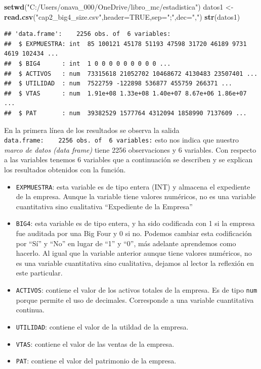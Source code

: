 \documentclass[]{book}
\newenvironment{Shaded}{\begin{snugshade}}{\end{snugshade}}
\newcommand{\KeywordTok}[1]{\textcolor[rgb]{0.13,0.29,0.53}{\textbf{#1}}}
\newcommand{\DataTypeTok}[1]{\textcolor[rgb]{0.13,0.29,0.53}{#1}}
\newcommand{\StringTok}[1]{\textcolor[rgb]{0.31,0.60,0.02}{#1}}
\newcommand{\OtherTok}[1]{\textcolor[rgb]{0.56,0.35,0.01}{#1}}
\newcommand{\NormalTok}[1]{#1}
\providecommand{\tightlist}{%
  \setlength{\itemsep}{0pt}\setlength{\parskip}{0pt}}
\begin{document}
\begin{Shaded}
\begin{Highlighting}[]
\KeywordTok{setwd}\NormalTok{(}\StringTok{"C:/Users/onava_000/OneDrive/libro_mc/estadistica"}\NormalTok{)}
\NormalTok{datos1 <-}\StringTok{ }\KeywordTok{read.csv}\NormalTok{(}\StringTok{"cap2_big4_size.csv"}\NormalTok{,}\DataTypeTok{header=}\OtherTok{TRUE}\NormalTok{,}\DataTypeTok{sep=}\StringTok{";"}\NormalTok{,}\DataTypeTok{dec=}\StringTok{","}\NormalTok{)}
\KeywordTok{str}\NormalTok{(datos1)}
\end{Highlighting}
\end{Shaded}

\begin{verbatim}
## 'data.frame':    2256 obs. of  6 variables:
##  $ EXPMUESTRA: int  85 100121 45178 51193 47598 31720 46189 9731 4619 102434 ...
##  $ BIG4      : int  1 0 0 0 0 0 0 0 0 0 ...
##  $ ACTIVOS   : num  73315618 21052702 10468672 4130483 23507401 ...
##  $ UTILIDAD  : num  7522759 -122898 536877 455759 266371 ...
##  $ VTAS      : num  1.91e+08 1.33e+08 1.40e+07 8.67e+06 1.86e+07 ...
##  $ PAT       : num  39382529 1577764 4312094 1858990 7137609 ...
\end{verbatim}

En la primera línea de los resultados se observa la salida
\texttt{\textquotesingle{}data.frame\textquotesingle{}:\ \ \ \ 2256\ obs.\ of\ \ 6\ variables:}
esto nos indica que nuestro \emph{marco de datos (data frame)} tiene
2256 observaciones y 6 variables. Con respecto a las variables tenemos 6
variables que a continuación se describen y se explican los resultados
obtenidos con la función.

\begin{itemize}
\tightlist
\item
  \texttt{EXPMUESTRA}: esta variable es de tipo entera (INT) y almacena
  el expediente de la empresa. Aunque la variable tiene valores
  numéricos, no es una variable cuantitativa sino cualitativa
  ``Expediente de la Empresa''
\item
  \texttt{BIG4}: esta variable es de tipo entera, y ha sido codificada
  con 1 si la empresa fue auditada por una Big Four y 0 si no. Podemos
  cambiar esta codificación por ``Sí'' y ``No'' en lugar de ``1'' y
  ``0'', más adelante aprendemos como hacerlo. Al igual que la variable
  anterior aunque tiene valores numéricos, no es una variable
  cuantitativa sino cualitativa, dejamos al lector la reflexión en este
  particular.
\item
  \texttt{ACTIVOS}: contiene el valor de los activos totales de la
  empresa. Es de tipo \texttt{num} porque permite el uso de decimales.
  Corresponde a una variable cuantitativa continua.
\item
  \texttt{UTILIDAD}: contiene el valor de la utildad de la empresa.
\item
  \texttt{VTAS}: contiene el valor de las ventas de la empresa.
\item
  \texttt{PAT}: contiene el valor del patrimonio de la empresa.
\end{itemize}
\end{document}
